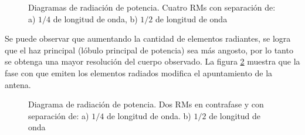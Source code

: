 \begin{figure}[H]
	\centering
	\caption{Diagramas de radiación de potencia. Cuatro RMs con separación de: a) $1/4$ de longitud de onda, b) $1/2$ de longitud
		de onda}
	\label{fig:fourArrayPat}
\end{figure}

Se puede observar que aumentando la cantidad de elementos radiantes, se logra que el haz principal (lóbulo principal de
potencia) sea más angosto, por lo tanto se obtenga una mayor resolución del cuerpo observado. La figura \ref{fig:directArrayPat} 
muestra que la fase con que emiten los elementos radiados modifica el apuntamiento de la antena.

\begin{figure}[H]
	\centering
	\caption{Diagrama de radiación de potencia. Dos RMs en contrafase y con separación de: a) $1/4$ de longitud de onda. b) $1/2$ 
		de longitud de onda}
	\label{fig:directArrayPat}
\end{figure}


